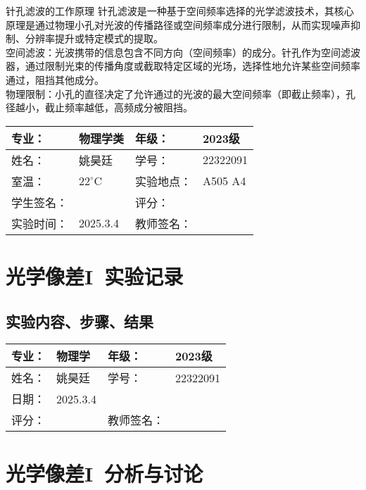 \documentclass[dvipsnames, svgnames,a4paper,11pt]{article}
\newcommand{\exname}{光学像差I}%
\begin{document}
\begin{question}
	针孔滤波的工作原理
	\tcblower
	针孔滤波是一种基于空间频率选择的光学滤波技术，其核心原理是通过物理小孔对光波的传播路径或空间频率成分进行限制，从而实现噪声抑制、分辨率提升或特定模式的提取。\\
	空间滤波：光波携带的信息包含不同方向（空间频率）的成分。针孔作为空间滤波器，通过限制光束的传播角度或截取特定区域的光场，选择性地允许某些空间频率通过，阻挡其他成分。\\
	物理限制：小孔的直径决定了允许通过的光波的最大空间频率（即截止频率），孔径越小，截止频率越低，高频成分被阻挡。
\end{question}
\clearpage
{}
\begin{table}
	\renewcommand\arraystretch{1.7}
	\centering
	\begin{tabularx}{\textwidth}{|X|X|X|X|}
	\hline
	专业：& 物理学类 &年级：& 2023级 \\
	\hline
	姓名： &姚昊廷& 学号：&22322091  \\
	\hline
	室温：&$22^\circ$C&实验地点：&A505  A4\\
	\hline
	学生签名：& & 评分： &\\
	\hline
	实验时间：& 2025.3.4& 教师签名：&\\
	\hline
	\end{tabularx}
\end{table}
\section{\exname\ \textbf{实验记录}}
\subsection{实验内容、步骤、结果}


\clearpage
{}
\begin{table}
	\renewcommand\arraystretch{1.7}
	\begin{tabularx}{\textwidth}{|X|X|X|X|}
	\hline
	专业：& 物理学 &年级：& 2023级\\
	\hline
	姓名： &姚昊廷& 学号：&22322091 \\
	\hline
    日期：&2025.3.4 &  &\\
	\hline
	评分：&&教师签名：&\\
	\hline
	\end{tabularx}
\end{table}

\section{\exname\ \textbf{分析与讨论}}
\end{document}
